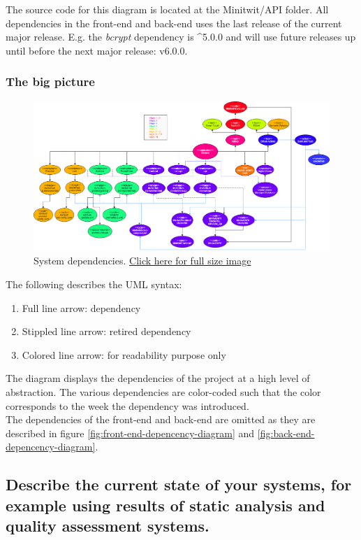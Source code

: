 The source code for this diagram is located at the Minitwit/API folder.
All dependencies in the front-end and back-end uses the last release of the current major release. E.g. the \textit{bcrypt} dependency is \string^5.0.0 and will use future releases up until before the next major release: v6.0.0.

\subsubsection{The big picture}


\begin{figure}[H]
    \centering
    \includegraphics[scale=0.25, left]{report/images/system-dependencies.png}
    \caption{System dependencies. \href{https://github.com/Niels-Frederik/MiniTwit/blob/main/report/images/system-dependencies.png}{Click here for full size image}}
    \label{fig:system-depencencies}
\end{figure}

The following describes the UML syntax:
\begin{enumerate}
    \item Full line arrow: dependency
    \item Stippled line arrow: retired dependency
    \item Colored line arrow: for readability purpose only
\end{enumerate}
The diagram displays the dependencies of the project at a high level of abstraction. The various dependencies are color-coded such that the color corresponds to the week the dependency was introduced. 
\\
The dependencies of the front-end and back-end are omitted as they are described in figure \ref{fig:front-end-depencency-diagram} and \ref{fig:back-end-depencency-diagram}.

\subsection{Describe the current state of your systems, for example using results of static analysis and quality assessment systems.}

